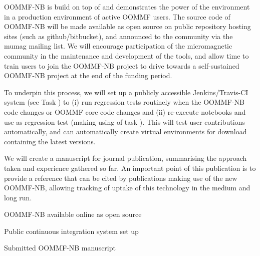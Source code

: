 \begin{workpackage}[id=dissem,wphases=18-48!.5,
  title=Dissemination,
  SARM=1,
  USORM=7,
  USHRM=8
]
\begin{tasklist}
\begin{task}[id=dissemination-of-oommf-nb-virtual-environment,
  title=Dissemination of OOMMF-NB virtual environment]
  OOMMF-NB is build on top of \TheProject and demonstrates the power
  of the environment in a production environment of active OOMMF users. 
  The source code of OOMMF-NB will be made available as open source on
  public repository hosting sites (such as github/bitbucket), and
  announced to the community via the mumag mailing list. We will
  encourage participation of the micromagnetic community in the
  maintenance and development of the tools, and allow time to train
  users to join the OOMMF-NB project to drive towards a self-sustained
  OOMMF-NB project at the end of the funding period.

  To underpin this process, we will set up a publicly accessible Jenkins/Travis-CI system
  (see Task ) to (i) run regression tests routinely when the
  OOMMF-NB code changes or OOMMF core code changes and (ii) re-execute notebooks and use
  as regression test (making using of task ). This will
  test user-contributions automatically, and can automatically create virtual environments
  for download containing the latest versions.

  We will create a manuscript for journal publication, summarising the
  approach taken and experience gathered so far. An important point of
  this publication is to provide a reference that can be cited by
  publications making use of the new OOMMF-NB, allowing tracking of
  uptake of this technology in the medium and long run.
\end{task}
\end{tasklist}

\begin{wpdelivs}
  \begin{wpdeliv}[due=15,id=OOMMF-NB-opensource,dissem=??,nature=??]
      {OOMMF-NB available online as open source}
\end{wpdeliv}
  \begin{wpdeliv}[due=18,id=OOMMF-NB-opensource-testing,dissem=??,nature=??]
      {Public continuous integration system set up}
\end{wpdeliv}
  \begin{wpdeliv}[due=36,id=OOMMF-NB-opensource-manuscript,dissem=??,nature=??]
      {Submitted OOMMF-NB manuscript}
\end{wpdeliv}


\end{wpdelivs}
\end{workpackage}

